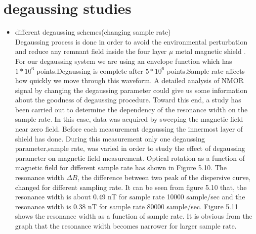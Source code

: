 \documentclass[12pt]{report}
\begin{document}
   \section{degaussing studies}  
   \begin{itemize}
   \item different degaussing schemes(changing sample rate)\\
Degaussing process is done in order to avoid the environmental perturbation and reduce any remnant field inside the four layer $\mu$ metal magnetic shield \cite{doi:10.1063/1.2713433}. For our degaussing system we are using an envelope function which has $1*10^6$ points.Degaussing is complete after $5*10^6$ points.Sample rate affects how quickly we move through this waveform. A detailed analysis of NMOR signal by changing the degaussing parameter could give us some information about the goodness of degaussing procedure. Toward this end, a study has been carried out to determine  the dependency of the resonance width on the sample rate. In this case, data was acquired by sweeping the magnetic field near zero field. Before each measurement degaussing the innermost layer of shield has done. During this measurement only one degaussing parameter,sample rate, was varied in order to study the effect of degaussing parameter on magnetic field measurement.  Optical rotation as a function of magnetic field for different sample rate has shown in Figure 5.10. The resonance width $\Delta B$, the difference between two peak of the dispersive curve, changed for different sampling rate. It can be seen from figure 5.10 that, the resonance width is about 0.49 nT for sample rate 10000 sample/sec and the resonance width is 0.38 nT for sample rate 80000 sample/sec. Figure 5.11 shows the resonance width as a function of sample rate. It is obvious from the graph that the resonance width becomes narrower for larger sample rate.    
   

\end{itemize}
\end{document}

